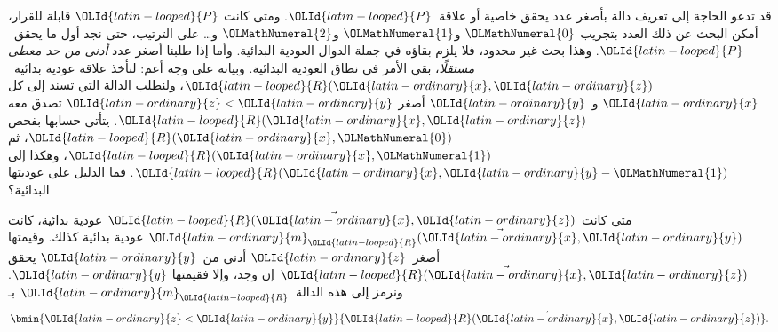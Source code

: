 \documentclass[../../../include/open-logic-section]{subfiles}
\begin{document}

\begin{explain}
قد تدعو الحاجة إلى تعريف دالة بأصغر عدد يحقق خاصية أو
علاقة~${\OLId{latin-looped}{P}}$. ومتى كانت ${\OLId{latin-looped}{P}}$ قابلة للقرار، أمكن البحث عن ذلك العدد
بتجريب ${\OLMathNumeral{0}}$ و${\OLMathNumeral{1}}$ و${\OLMathNumeral{2}}$ و… على الترتيب، حتى نجد أول ما
يحقق~${\OLId{latin-looped}{P}}$. وهذا بحث غير محدود، فلا يلزم بقاؤه في جملة الدوال
العودية البدائية. وأما إذا طلبنا أصغر عدد
\emph{أدنى من حد معطى مستقلًا}، بقي الأمر في نطاق العودية البدائية.
وبيانه على وجه أعم: لنأخذ علاقة عودية بدائية~${\OLId{latin-looped}{R}}({\OLId{latin-ordinary}{x}},{\OLId{latin-ordinary}{z}})$،
ولنطلب الدالة التي تسند إلى كل ${\OLId{latin-ordinary}{x}}$ و~${\OLId{latin-ordinary}{y}}$ أصغر ${\OLId{latin-ordinary}{z}}<{\OLId{latin-ordinary}{y}}$ تصدق معه
${\OLId{latin-looped}{R}}({\OLId{latin-ordinary}{x}},{\OLId{latin-ordinary}{z}})$. يتأتى حسابها بفحص ${\OLId{latin-looped}{R}}({\OLId{latin-ordinary}{x}},{\OLMathNumeral{0}})$، ثم ${\OLId{latin-looped}{R}}({\OLId{latin-ordinary}{x}},{\OLMathNumeral{1}})$، وهكذا إلى
${\OLId{latin-looped}{R}}({\OLId{latin-ordinary}{x}},{\OLId{latin-ordinary}{y}}-{\OLMathNumeral{1}})$. فما الدليل على عوديتها البدائية؟
\end{explain}

\begin{prop}
متى كانت ${\OLId{latin-looped}{R}}(\vec {\OLId{latin-ordinary}{x}},{\OLId{latin-ordinary}{z}})$ عودية بدائية، كانت ${\OLId{latin-ordinary}{m}}_{\OLId{latin-looped}{R}}(\vec{{\OLId{latin-ordinary}{x}}},{\OLId{latin-ordinary}{y}})$
عودية بدائية كذلك. وقيمتها أصغر~${\OLId{latin-ordinary}{z}}$ أدنى من~${\OLId{latin-ordinary}{y}}$ يحقق
${\OLId{latin-looped}{R}}(\vec {\OLId{latin-ordinary}{x}},{\OLId{latin-ordinary}{z}})$ إن وجد، وإلا فقيمتها ${\OLId{latin-ordinary}{y}}$. ونرمز إلى هذه الدالة~${\OLId{latin-ordinary}{m}}_{\OLId{latin-looped}{R}}$ بـ
\[
\bmin{{\OLId{latin-ordinary}{z}} < {\OLId{latin-ordinary}{y}}}{{\OLId{latin-looped}{R}}(\vec{{\OLId{latin-ordinary}{x}}}, {\OLId{latin-ordinary}{z}})}.
\]
\end{prop}
\end{document}
